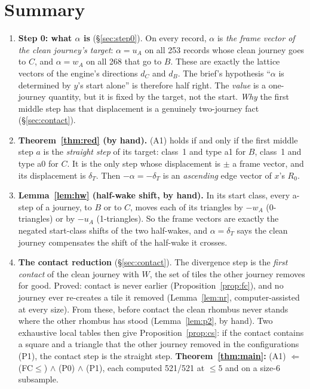\documentclass[11pt]{article}
\theoremstyle{definition}\newtheorem{definition}[theorem]{Definition}\newtheorem{remark}[theorem]{Remark}
\begin{document}
\section*{Summary}
\begin{enumerate}
\item \textbf{Step 0: what $\alpha$ is} (\S\ref{sec:step0}). On every record, $\alpha$ is \emph{the frame vector of the clean journey's target}: $\alpha=u_A$ on all 253 records whose clean journey goes to $C$, and $\alpha=w_A$ on all 268 that go to $B$. These are exactly the lattice vectors of the engine's directions $d_C$ and $d_B$.
The brief's hypothesis ``$\alpha$ is determined by $y$'s start alone'' is therefore half right. The \emph{value} is a one-journey quantity, but it is fixed by the target, not the start. \emph{Why} the first middle step has that displacement is a genuinely two-journey fact (\S\ref{sec:contact}).
\item \textbf{Theorem~\ref{thm:red} (by hand).} (A1) holds if and only if the first middle step $a$ is the \emph{straight step} of its target: class~1 and type a1 for $B$, class~1 and type a0 for $C$. It is the only step whose displacement is $\pm$ a frame vector, and its displacement is $\delta_T$. Then $-\alpha=-\delta_T$ is an \emph{ascending} edge vector of $x$'s $R_0$.
\item \textbf{Lemma~\ref{lem:hw} (half-wake shift, by hand).} In its start class, every a-step of a journey, to $B$ or to $C$, moves each of its triangles by $-w_A$ (0-triangles) or by $-u_A$ (1-triangles). So the frame vectors are exactly the negated start-class shifts of the two half-wakes, and $\alpha=\delta_{T}$ says the clean journey compensates the shift of the half-wake it crosses.
\item \textbf{The contact reduction} (\S\ref{sec:contact}). The divergence step is the \emph{first contact} of the clean journey with $W$, the set of tiles the other journey removes for good. Proved: contact is never earlier (Proposition~\ref{prop:fc}), and no journey ever re-creates a tile it removed (Lemma~\ref{lem:nr}, computer-assisted at every size). From these, before contact the clean rhombus never stands where the other rhombus has stood (Lemma~\ref{lem:p2}, by hand).
Two exhaustive local tables then give Proposition~\ref{prop:cs}: if the contact contains a square and a triangle that the other journey removed in the configurations (P1), the contact step is the straight step.
\textbf{Theorem~\ref{thm:main}:} (A1) $\Leftarrow$ (FC$\le$) $\wedge$ (P0) $\wedge$ (P1), each computed 521/521 at $\le5$ and on a size-6 subsample.

\end{enumerate}
\end{document}
